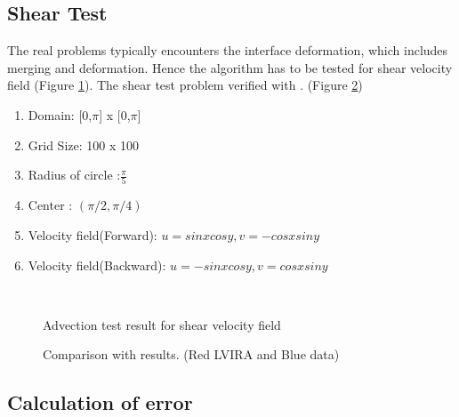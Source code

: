\subsection{Shear Test}
The real problems typically encounters the interface deformation, which includes merging and deformation. Hence the algorithm has to be 
tested for shear velocity field (Figure \ref{Fig:shear}). The shear test problem verified with \cite{Gerlach2006}. (Figure \ref{Fig:shear_comparison}) 

   \begin{enumerate}
 \item Domain: [0,$\pi$] x [0,$\pi$]
 \item Grid Size: 100 x 100
 \item Radius of circle :$\frac{\pi}{5}$
 \item Center : $(\pi/2,\pi/4)$
 \item Velocity field(Forward):  $u=sin x cos y, v=-cos x sin y$
  \item Velocity field(Backward):  $u=-sin x cos y,v=cos x sin y$
 \end{enumerate}
 
\begin{figure}
\centering
 \\
 \caption{Advection test result for shear velocity field}
 \label{Fig:shear}
\end{figure}

\begin{figure}
 \centering
 \caption{Comparison with \cite{Gerlach2006} results. (Red LVIRA and Blue \cite{Gerlach2006} data)}
 \label{Fig:shear_comparison}
\end{figure}

\subsection{Calculation of error}

